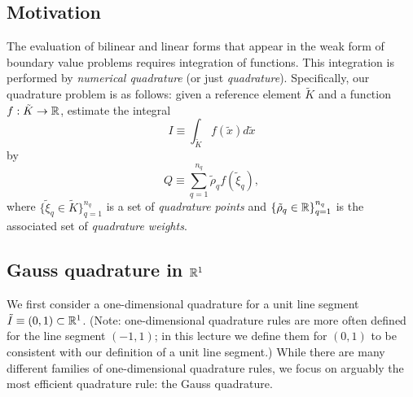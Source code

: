 \subsection{Motivation}
The evaluation of bilinear and linear forms that appear in the weak form of boundary value problems requires integration of functions. 
This integration is performed by \emph{numerical quadrature} (or just \emph{quadrature}).  Specifically, our quadrature problem is as follows: given a reference element $\tilde K$ and a function $f: \tilde K \to \mathbb{R}$, estimate the integral
\begin{equation*}
  I \equiv \int_{\tilde K} f(\tilde x) d \tilde x
\end{equation*}
by
\begin{equation*}
  Q \equiv \sum_{q=1}^{n_q} \tilde \rho_q f(\tilde \xi_q),
\end{equation*}
where $\{\tilde \xi_q \in \tilde K \}_{q=1}^{n_q}$ is a set of \emph{quadrature points} and $\{\tilde \rho_q \in \mathbb{R} \}_{q=1}^{n_q}$ is the associated set of \emph{quadrature weights}. 

\subsection{Gauss quadrature in $\mathbb{R}^1$}
\label{sec:fe_quad_1d}
We first consider a one-dimensional quadrature for a unit line segment $\tilde I \equiv (0,1) \subset \mathbb{R}^1$.  (Note: one-dimensional quadrature rules are more often defined for the line segment $(-1,1)$; in this lecture we define them for $(0,1)$ to be consistent with our definition of a unit line segment.)  While there are many different families of one-dimensional quadrature rules, we focus on arguably the most efficient quadrature rule: the Gauss quadrature.

